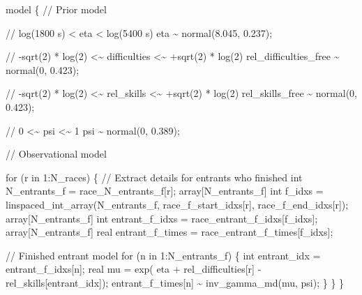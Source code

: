 \documentclass[
  letterpaper,
  DIV=11,
  numbers=noendperiod]{scrartcl}
\newenvironment{Shaded}{\begin{snugshade}}{\end{snugshade}}
\newcommand{\CommentTok}[1]{\textcolor[rgb]{0.37,0.37,0.37}{#1}}
\newcommand{\ControlFlowTok}[1]{\textcolor[rgb]{0.00,0.23,0.31}{#1}}
\newcommand{\DataTypeTok}[1]{\textcolor[rgb]{0.68,0.00,0.00}{#1}}
\newcommand{\DecValTok}[1]{\textcolor[rgb]{0.68,0.00,0.00}{#1}}
\newcommand{\FloatTok}[1]{\textcolor[rgb]{0.68,0.00,0.00}{#1}}
\newcommand{\KeywordTok}[1]{\textcolor[rgb]{0.00,0.23,0.31}{#1}}
\newcommand{\NormalTok}[1]{\textcolor[rgb]{0.00,0.23,0.31}{#1}}
\begin{document}
\begin{codelisting}
\begin{Shaded}
\begin{Highlighting}[]
\KeywordTok{model}\NormalTok{ \{}
  \CommentTok{// Prior model}

  \CommentTok{// log(1800 s) \textless{} eta \textless{} log(5400 s)}
\NormalTok{  eta \textasciitilde{} normal(}\FloatTok{8.045}\NormalTok{, }\FloatTok{0.237}\NormalTok{);}

  \CommentTok{// {-}sqrt(2) * log(2) \textless{}\textasciitilde{} difficulties \textless{}\textasciitilde{} +sqrt(2) * log(2)}
\NormalTok{  rel\_difficulties\_free \textasciitilde{} normal(}\DecValTok{0}\NormalTok{, }\FloatTok{0.423}\NormalTok{);}

  \CommentTok{// {-}sqrt(2) * log(2) \textless{}\textasciitilde{} rel\_skills \textless{}\textasciitilde{} +sqrt(2) * log(2)}
\NormalTok{  rel\_skills\_free \textasciitilde{} normal(}\DecValTok{0}\NormalTok{, }\FloatTok{0.423}\NormalTok{);}

  \CommentTok{// 0 \textless{}\textasciitilde{} psi \textless{}\textasciitilde{} 1}
\NormalTok{  psi \textasciitilde{} normal(}\DecValTok{0}\NormalTok{, }\FloatTok{0.389}\NormalTok{);}

  \CommentTok{// Observational model}

  \ControlFlowTok{for}\NormalTok{ (r }\ControlFlowTok{in} \DecValTok{1}\NormalTok{:N\_races) \{}
    \CommentTok{// Extract details for entrants who finished}
    \DataTypeTok{int}\NormalTok{ N\_entrants\_f = race\_N\_entrants\_f[r];}
    \DataTypeTok{array}\NormalTok{[N\_entrants\_f] }\DataTypeTok{int}\NormalTok{ f\_idxs}
\NormalTok{      = linspaced\_int\_array(N\_entrants\_f,}
\NormalTok{                            race\_f\_start\_idxs[r],}
\NormalTok{                            race\_f\_end\_idxs[r]);}
    \DataTypeTok{array}\NormalTok{[N\_entrants\_f] }\DataTypeTok{int}\NormalTok{ entrant\_f\_idxs}
\NormalTok{      = race\_entrant\_f\_idxs[f\_idxs];}
    \DataTypeTok{array}\NormalTok{[N\_entrants\_f] }\DataTypeTok{real}\NormalTok{ entrant\_f\_times}
\NormalTok{      = race\_entrant\_f\_times[f\_idxs];}

    \CommentTok{// Finished entrant model}
    \ControlFlowTok{for}\NormalTok{ (n }\ControlFlowTok{in} \DecValTok{1}\NormalTok{:N\_entrants\_f) \{}
      \DataTypeTok{int}\NormalTok{ entrant\_idx = entrant\_f\_idxs[n];}
      \DataTypeTok{real}\NormalTok{ mu = exp(  eta}
\NormalTok{                    + rel\_difficulties[r]}
\NormalTok{                    {-} rel\_skills[entrant\_idx]);}
\NormalTok{      entrant\_f\_times[n] \textasciitilde{} inv\_gamma\_md(mu, psi);}
\NormalTok{    \}}
\NormalTok{  \}}
\NormalTok{\}}


\end{Highlighting}
\end{Shaded}
\end{codelisting}
\end{document}
